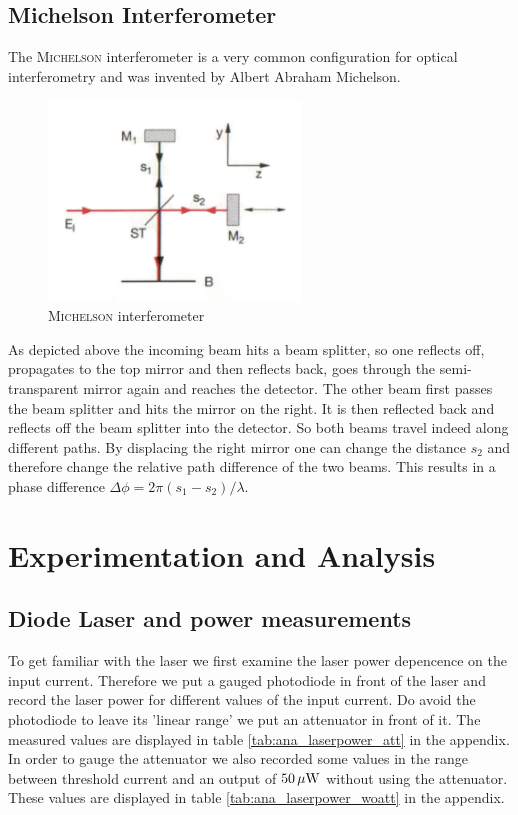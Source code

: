 \documentclass{protokoll_en}
\begin{document}
\subsection{Michelson Interferometer}
The \textsc{Michelson} interferometer is a very common configuration for optical interferometry and was invented by Albert Abraham Michelson. 
\begin{figure}[H]
	\centering
		\includegraphics[width=0.6\textwidth]{graphics/michelson}
	\caption{\textsc{Michelson} interferometer~\cite{demtroed2}}
	\label{fig:michelson}
\end{figure}
As depicted above the incoming beam hits a beam splitter, so one reflects off, propagates to the top mirror and then reflects back, goes through the semi-transparent mirror again and reaches the detector. The other beam first passes the beam splitter and hits the mirror on the right. It is then reflected back and reflects off the beam splitter into the detector. So both beams travel indeed along different paths. By displacing the right mirror one can change the distance $s_2$ and therefore change the relative path difference of the two beams. This results in a phase difference $\Delta \phi = 2\pi (s_1-s_2)/\lambda$.


\section{Experimentation and Analysis}
\subsection{Diode Laser and power measurements}\label{ana_laserpower}
To get familiar with the laser we first examine the laser power depencence on the input current. Therefore we put a gauged photodiode in front of the laser and record the laser power for different values of the input current. Do avoid the photodiode to leave its 'linear range' we put an attenuator in front of it. The measured values are displayed in table \ref{tab:ana_laserpower_att} in the appendix. In order to gauge the attenuator we also recorded some values in the range between threshold current and an output of $\unit[50]{\mu W}$ without using the attenuator. These values are displayed in table \ref{tab:ana_laserpower_woatt} in the appendix.
\end{document}
